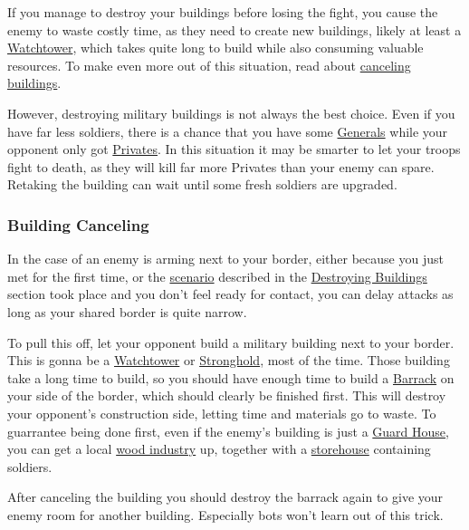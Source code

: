 \documentclass[12pt]{article}
\begin{document}
\label{wastingenemyresourcesbydestroyingbuildings}
If you manage to destroy your buildings before losing the fight, you cause the enemy to waste costly time, as they need to create new buildings, likely at least a \hyperref[sec:watchtower]{Watchtower}, which takes quite long to build while also consuming valuable resources. To make even more out of this situation, read about \hyperref[sec:buildingcanceling]{canceling buildings}.

However, destroying military buildings is not always the best choice. Even if you have far less soldiers, there is a chance that you have some \hyperref[sec:general]{Generals} while your opponent only got \hyperref[sec:private]{Privates}. In this situation it may be smarter to let your troops fight to death, as they will kill far more Privates than your enemy can spare. Retaking the building can wait until some fresh soldiers are upgraded.

\subsubsection{Building Canceling}
\label{sec:buildingcanceling}

In the case of an enemy is arming next to your border, either because you just met for the first time, or the \hyperref[wastingenemyresourcesbydestroyingbuildings]{scenario} described in the \hyperref[sec:destroyingbuildings]{Destroying Buildings} section took place and you don't feel ready for contact, you can delay attacks as long as your shared border is quite narrow.

To pull this off, let your opponent build a military building next to your border. This is gonna be a \hyperref[sec:watchtower]{Watchtower} or \hyperref[sec:stronghold]{Stronghold}, most of the time. Those building take a long time to build, so you should have enough time to build a \hyperref[sec:barrack]{Barrack} on your side of the border, which should clearly be finished first. This will destroy your opponent's construction side, letting time and materials go to waste. To guarrantee being done first, even if the enemy's building is just a \hyperref[sec:guardhouse]{Guard House}, you can get a local \hyperref[sec:woodindustry]{wood industry} up, together with a \hyperref[sec:storehouse]{storehouse} containing soldiers.

After canceling the building you should destroy the barrack again to give your enemy room for another building. Especially bots won't learn out of this trick.
\end{document}
